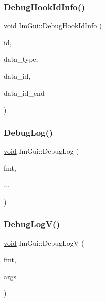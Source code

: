 \mbox{\label{namespaceImGui_a5487269f4cb9fb809fd3e797411ed2d7}} 
\subsubsection{\texorpdfstring{Debug\+Hook\+Id\+Info()}{DebugHookIdInfo()}}
{\footnotesize\ttfamily \hyperlink{imgui__impl__opengl3__loader_8h_ac668e7cffd9e2e9cfee428b9b2f34fa7}{void} Im\+Gui\+::\+Debug\+Hook\+Id\+Info (\begin{DoxyParamCaption}\item[{Im\+Gui\+ID}]{id,  }\item[{Im\+Gui\+Data\+Type}]{data\+\_\+type,  }\item[{const \hyperlink{imgui__impl__opengl3__loader_8h_ac668e7cffd9e2e9cfee428b9b2f34fa7}{void} $\ast$}]{data\+\_\+id,  }\item[{const \hyperlink{imgui__impl__opengl3__loader_8h_ac668e7cffd9e2e9cfee428b9b2f34fa7}{void} $\ast$}]{data\+\_\+id\+\_\+end }\end{DoxyParamCaption})}

\mbox{\label{namespaceImGui_aaa66ae54a7078d4e14d957b85571f6d0}} 
\subsubsection{\texorpdfstring{Debug\+Log()}{DebugLog()}}
{\footnotesize\ttfamily \hyperlink{imgui__impl__opengl3__loader_8h_ac668e7cffd9e2e9cfee428b9b2f34fa7}{void} Im\+Gui\+::\+Debug\+Log (\begin{DoxyParamCaption}\item[{const char $\ast$}]{fmt,  }\item[{}]{... }\end{DoxyParamCaption})}

\mbox{\label{namespaceImGui_afa024e012e162b5a7904b848e1d8d92e}} 
\subsubsection{\texorpdfstring{Debug\+Log\+V()}{DebugLogV()}}
{\footnotesize\ttfamily \hyperlink{imgui__impl__opengl3__loader_8h_ac668e7cffd9e2e9cfee428b9b2f34fa7}{void} Im\+Gui\+::\+Debug\+LogV (\begin{DoxyParamCaption}\item[{const char $\ast$}]{fmt,  }\item[{va\+\_\+list}]{args }\end{DoxyParamCaption})}

